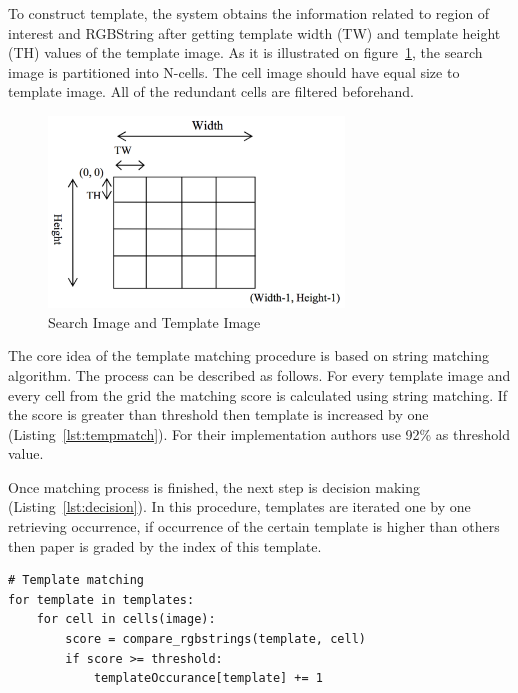 \documentclass{lutmscthesis}[2010/09/22]
\begin{document}
To construct template, the system obtains the information
related to region of interest and RGBString
after getting template width (TW) and template height (TH)
values of the template image. As it is illustrated on figure~\ref{afig:searchimg}, the
search image is partitioned into N-cells. The cell
image should have equal size to template image.
All of the redundant cells are filtered beforehand.

\begin{figure}[htp]
  {\par\centering
  \includegraphics[width=0.70\textwidth]{searchimg}
  \par}
  \caption{Search Image and Template Image~\cite{Rahman2009matching}}
  \label{afig:searchimg}
\end{figure}

The core idea of the template matching procedure is based
on string matching algorithm. The process can be described
as follows. For every template image and
every cell from the grid the matching score is calculated
using string matching. If the score is greater than
threshold then template is increased by one (Listing~\ref{lst:tempmatch}).
For their implementation authors use
92\% as threshold value.

Once matching process is finished, the next step is decision
making (Listing~\ref{lst:decision}). In this procedure, templates are iterated
one by one retrieving occurrence, if occurrence of the certain
template is higher than others then paper is graded by the
index of this template.

\begin{lstlisting}[caption={Template Matching Procedure}, label={lst:tempmatch}]
# Template matching
for template in templates:
    for cell in cells(image):
        score = compare_rgbstrings(template, cell)
        if score >= threshold:
            templateOccurance[template] += 1
\end{lstlisting}
\end{document}
